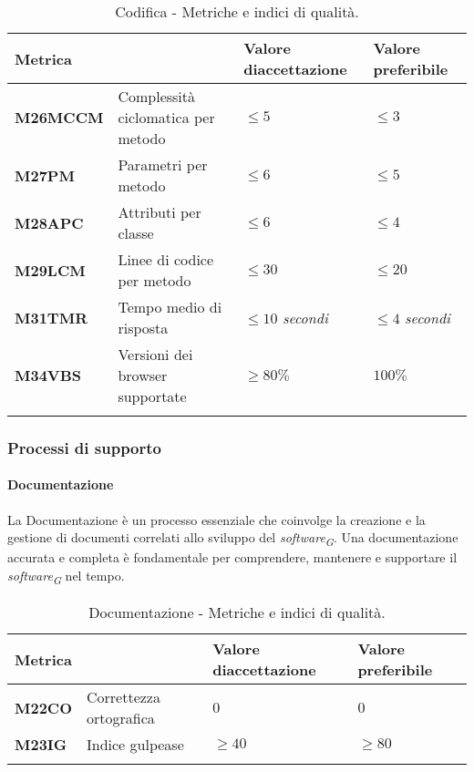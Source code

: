 \begin{longtable}{|C{1.9cm}|L{4cm}|L{2.2cm}|L{2.1cm}|}
    \hline
    \textbf{Metrica} &  & \textbf{Valore di\linebreak accettazione} & {\textbf{Valore \linebreak preferibile}} \\
    \hline \hline

    \textbf{M26MCCM} & Complessità ciclomatica per metodo & $\leq 5$ & $\leq 3$ \\
    \hline

    \textbf{M27PM} & Parametri per metodo & $\leq 6$ & $\leq 5$ \\
    \hline

    \textbf{M28APC} & Attributi per classe & $\leq 6$ & $\leq 4$ \\
    \hline

    \textbf{M29LCM} & Linee di codice per metodo & $\leq 30$ & $\leq 20$ \\
    \hline

    \textbf{M31TMR} & Tempo medio di risposta & $\leq 10$ \textit{secondi}  & $\leq 4$ \textit{secondi} \\
    \hline

    \textbf{M34VBS} & Versioni dei browser supportate & $\geq 80\%$ & $100\%$ \\
    \hline

    \caption{Codifica - Metriche e indici di qualità.}
    \label{tab:metriche}
\end{longtable}

\pagebreak

\subsubsection{Processi di supporto}

\paragraph{Documentazione}
La Documentazione è un processo essenziale che coinvolge la creazione e la gestione di documenti correlati allo sviluppo del \textit{software}\textsubscript{\textit{G}}. Una documentazione accurata e completa è fondamentale per comprendere, mantenere e supportare il \textit{software}\textsubscript{\textit{G}} nel tempo.

\begin{longtable}{|C{1.9cm}|L{4cm}|L{2.2cm}|L{2.1cm}|}
    \hline
    \textbf{Metrica} &  & \textbf{Valore di\linebreak accettazione} & {\textbf{Valore \linebreak preferibile}} \\
    \hline \hline

    \textbf{M22CO} & Correttezza ortografica & $0$ & $0$ \\
    \hline

    \textbf{M23IG} & Indice gulpease & $\geq 40$ & $\geq 80$ \\
    \hline

    \caption{Documentazione - Metriche e indici di qualità.}
    \label{tab:metriche_testo}
\end{longtable}

